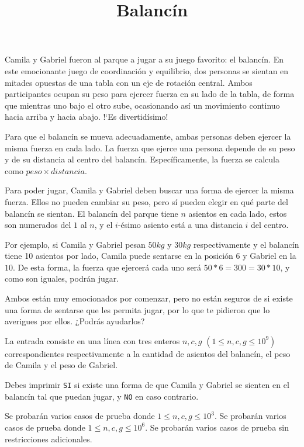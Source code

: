\documentclass{oci}
\title{Balancín}
\begin{document}
\begin{problemDescription}
    Camila y Gabriel fueron al parque a jugar a su juego favorito: el balancín.
    En este emocionante juego de coordinación y equilibrio, dos personas se
    sientan en mitades opuestas de una tabla con un eje de rotación central.
    Ambos participantes ocupan su peso para ejercer fuerza en su lado de la tabla,
    de forma que mientras uno bajo el otro sube, ocasionando así un movimiento
    continuo hacia arriba y hacia abajo.
    !`Es divertidísimo!

    Para que el balancín se mueva adecuadamente, ambas personas deben ejercer
    la misma fuerza en cada lado.
    La fuerza que ejerce una persona depende de su peso y de su distancia
    al centro del balancín.
    Específicamente, la fuerza se calcula como $peso \times distancia$.

    Para poder jugar, Camila y Gabriel deben buscar una forma de ejercer
    la misma fuerza.
    Ellos no pueden cambiar su peso, pero sí pueden elegir en qué parte
    del balancín se sientan.
    El balancín del parque tiene $n$ asientos en cada lado,
    estos son numerados del $1$ al $n$,
    y el $i$-ésimo asiento está a una distancia $i$ del centro.

    Por ejemplo, si Camila y Gabriel pesan $50kg$ y $30kg$
    respectivamente y el balancín tiene 10 asientos por lado,
    Camila puede sentarse en la posición $6$ y Gabriel en la $10$.
    De esta forma, la fuerza que ejercerá cada uno será $50*6=300=30*10$,
    y como son iguales, podrán jugar.

    Ambos están muy emocionados por comenzar, pero no están seguros de si
    existe una forma de sentarse que les permita jugar, por lo que te pidieron
    que lo averigues por ellos. ¿Podrás ayudarlos?

\end{problemDescription}

\begin{inputDescription}
    La entrada consiste en una línea con tres enteros $n, c, g$
    $(1 \leq n, c, g \leq 10^9)$ correspondientes respectivamente
    a la cantidad de asientos del balancín, el peso de Camila
    y el peso de Gabriel.
\end{inputDescription}

\begin{outputDescription}
	Debes imprimir \texttt{SI} si existe una forma de que Camila
	y Gabriel se sienten en el balancín tal que puedan jugar,
    y \texttt{NO} en caso contrario.
\end{outputDescription}

\begin{scoreDescription}
	 Se probarán varios casos de prueba donde $1 \leq n, c, g \leq 10^3$.
	 Se probarán varios casos de prueba donde $1 \leq n, c, g \leq 10^6$.
	 Se probarán varios casos de prueba sin restricciones adicionales.
\end{scoreDescription}

\begin{sampleDescription}
\end{sampleDescription}
\end{document}
